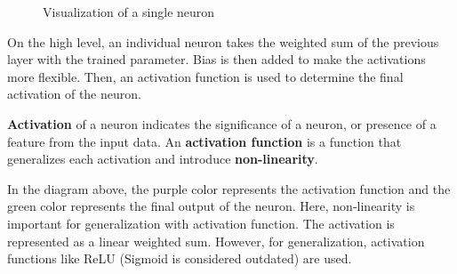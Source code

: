 \documentclass[../../../main.tex]{subfiles}
\begin{document}
\begin{figure}[H]
\centering
{}
\caption{Visualization of a single neuron}
\end{figure}

On the high level, an individual neuron takes the weighted
sum of the previous layer with the trained parameter.
Bias is then added to make the activations more flexible.
Then, an activation function is used to determine the final
activation of the neuron.

\begin{definition}{}{}
\textbf{Activation} of a neuron indicates the significance of
a neuron, or presence of a feature from the input data.
An \textbf{activation function} is a function that generalizes
each activation and introduce \textbf{non-linearity}.
\end{definition}

In the diagram above, the purple color represents the activation
function and the green color represents the final output of
the neuron. Here, non-linearity is important for generalization
with activation function. The activation is represented as
a linear weighted sum. However, for generalization, activation
functions like ReLU (Sigmoid is considered outdated) are used.
\end{document}

